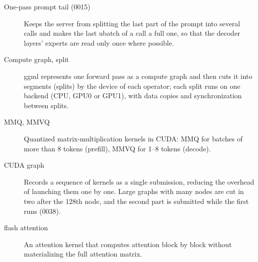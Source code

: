 \documentclass[11pt,a4paper]{article}
\begin{document}
\begin{description}
  \item[One-pass prompt tail (0015)] Keeps the server from splitting the last part of the prompt into several calls and makes the last ubatch of a call a full one, so that the decoder layers' experts are read only once where possible.
  \item[Compute graph, split] ggml represents one forward pass as a compute graph and then cuts it into segments (splits) by the device of each operator; each split runs on one backend (CPU, GPU0 or GPU1), with data copies and synchronization between splits.
  \item[MMQ, MMVQ] Quantized matrix-multiplication kernels in CUDA: MMQ for batches of more than 8 tokens (prefill), MMVQ for 1--8 tokens (decode).
  \item[CUDA graph] Records a sequence of kernels as a single submission, reducing the overhead of launching them one by one. Large graphs with many nodes are cut in two after the 128th node, and the second part is submitted while the first runs (0038).
  \item[flash attention] An attention kernel that computes attention block by block without materializing the full attention matrix.
\end{description}
\end{document}
